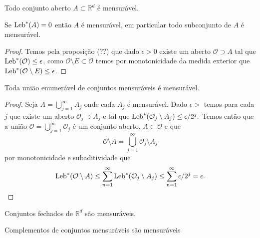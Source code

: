 \begin{proposicao}
Todo conjunto aberto $A\subset \mathbb{R}^d$ é  mensurável.
\end{proposicao}






\begin{proposicao}
Se $\textnormal{Leb}^{*}(A)=0$ então $A$ é  mensurável, em particular todo subconjunto de $A$ é mensurável.
\end{proposicao}
\begin{proof}
Temos pela proposição (??) que dado $\epsilon>0$ existe um aberto $\mathcal{O}\supset A$ tal que 
$\textnormal{Leb}^{*}(\mathcal{O})\leq \epsilon$, como $\mathcal{O}\setminus E\subset \mathcal{O}$ temos por monotonicidade da medida exterior que $\textnormal{Leb}^{*}(\mathcal{O}\setminus E)\leq \epsilon$. 
\end{proof}





\begin{proposicao}
Toda  união enumerável de conjuntos mensuráveis é mensurável.
\end{proposicao}

\begin{proof}
Seja $A=\bigcup_{j=1}^{\infty} A_j$ onde cada $A_j$ é mensurável. Dado $\epsilon>$ temos para cada $j$ que existe um aberto $\mathcal{O}_j\supset A_j$ e tal que $\textnormal{Leb}^{*}(\mathcal{O}_j\setminus A_j)\leq \epsilon/2^j. $ Temos então que  a união $\mathcal{O}=\bigcup_{j=1}^{\infty}\mathcal{O}_j$ é um conjunto aberto,   $A\subset \mathcal{O}$ e
que 
$$
\mathcal{O}\setminus A=\bigcup_{j=1}^{\infty} \mathcal{O}_j\setminus A_j
$$
por monotonicidade e subaditividade que 
$$
\textnormal{Leb}^{*}(\mathcal{O}\setminus A)\leq \sum_{n=1}^\infty \textnormal{Leb}^{*}(\mathcal{O}_j\setminus A_j)\leq \sum_{n=1}^\infty \epsilon/2^j=\epsilon.
$$

\end{proof}


\begin{proposicao}
Conjuntos fechados de $\mathbb{R}^d$ são mensuráveis.
\end{proposicao}





\begin{proposicao}
Complementos de conjuntos mensuráveis são mensuráveis
\end{proposicao}


\begin{proposicao}

\end{proposicao}
  

